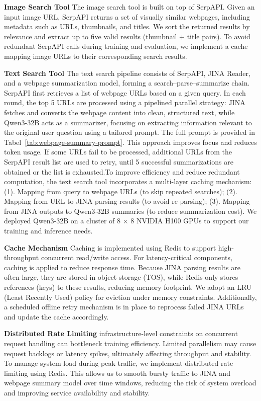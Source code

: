 \documentclass{article}
\begin{document}
\textbf{Image Search Tool} The image search tool is built on top of SerpAPI. Given an input image URL, SerpAPI returns a set of visually similar webpages, including metadata such as URLs, thumbnails, and titles. We sort the returned results by relevance and extract up to five valid results (thumbnail + title pairs). To avoid redundant SerpAPI calls during training and evaluation, we implement a cache mapping image URLs to their corresponding search results.

\textbf{Text Search Tool} The text search pipeline consists of SerpAPI, JINA Reader, and a webpage summarization model, forming a search–parse–summarize chain. SerpAPI first retrieves a list of webpage URLs based on a given query. In each round, the top 5 URLs are processed using a pipelined parallel strategy: JINA fetches and converts the webpage content into clean, structured text, while Qwen3-32B acts as a summarizer, focusing on extracting information relevant to the original user question using a tailored prompt. The full prompt is provided in Tabel~\ref{tab:webpage-summary-prompt}. This approach improves focus and reduces token usage. If some URLs fail to be processed, additional URLs from the SerpAPI result list are used to retry, until 5 successful summarizations are obtained or the list is exhausted.To improve efficiency and reduce redundant computation, the text search tool incorporates a multi-layer caching mechanism: (1). Mapping from query to webpage URLs (to skip repeated searches); (2). Mapping from URL to JINA parsing results (to avoid re-parsing); (3). Mapping from JINA outputs to Qwen3-32B summaries (to reduce summarization cost). We deployed Qwen3-32B on a cluster of 8 $\times$ 8 NVIDIA H100 GPUs to support our training and inference needs.

\textbf{Cache Mechanism} Caching is implemented using Redis to support high-throughput concurrent read/write access. For latency-critical components, caching is applied to reduce response time. Because JINA parsing results are often large, they are stored in object storage (TOS), while Redis only stores references (keys) to these results, reducing memory footprint. We adopt an LRU (Least Recently Used) policy for eviction under memory constraints. Additionally, a scheduled offline retry mechanism is in place to reprocess failed JINA URLs and update the cache accordingly.

\textbf{Distributed Rate Limiting} infrastructure-level constraints on concurrent request handling can bottleneck training efficiency. Limited parallelism may cause request backlogs or latency spikes, ultimately affecting throughput and stability. To manage system load during peak traffic, we implement distributed rate limiting using Redis. This allows us to smooth bursty traffic to JINA and webpage summary model over time windows, reducing the risk of system overload and improving service availability and stability.
\end{document}
